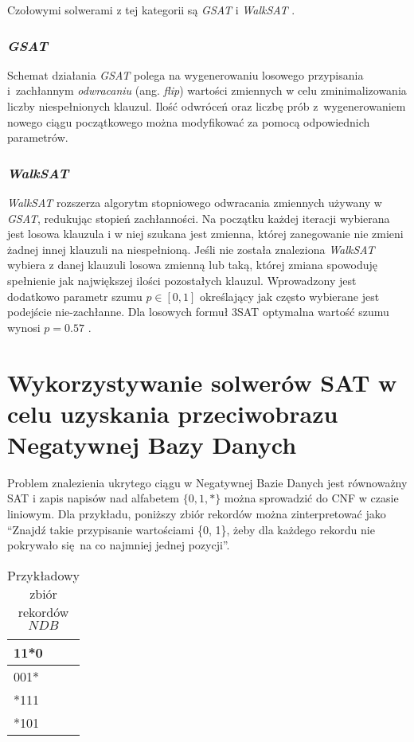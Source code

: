 Czołowymi solwerami z tej kategorii są \textit{GSAT} i \textit{WalkSAT} \cite{handbook-satifiability-incomplete}.


\subsubsection{\textit{GSAT}}
Schemat działania \textit{GSAT} polega na wygenerowaniu losowego przypisania i~zachłannym \textit{odwracaniu} (ang. \textit{flip})
wartości zmiennych w celu zminimalizowania liczby niespełnionych klauzul. Ilość odwróceń oraz liczbę prób
z~wygenerowaniem nowego ciągu początkowego można modyfikować za pomocą odpowiednich parametrów.

\subsubsection{\textit{WalkSAT}}
\textit{WalkSAT} rozszerza algorytm stopniowego odwracania zmiennych używany w \textit{GSAT}, redukując stopień zachłanności.
Na początku każdej iteracji wybierana jest losowa klauzula i w niej szukana jest zmienna, której zanegowanie nie zmieni żadnej
innej klauzuli na niespełnioną. Jeśli nie została znaleziona \textit{WalkSAT} wybiera z danej klauzuli losowa zmienną lub taką, której
zmiana spowoduję spełnienie jak największej ilości pozostałych klauzul. Wprowadzony jest dodatkowo parametr szumu $p \in [0, 1]$ określający
jak często wybierane jest podejście nie-zachłanne. Dla losowych formuł 3SAT optymalna wartość szumu wynosi $p = 0.57$ \cite{handbook-satifiability-incomplete}.



\section{Wykorzystywanie solwerów SAT w celu uzyskania przeciwobrazu Negatywnej Bazy Danych}

Problem znalezienia ukrytego ciągu w Negatywnej Bazie Danych jest równoważny SAT i zapis napisów nad alfabetem 
$\{0, 1, *\}$ można sprowadzić do CNF w czasie liniowym.
 Dla przykładu, poniższy zbiór rekordów można zinterpretować jako 
 \enquote{Znajdź takie przypisanie wartościami \{0, 1\}, żeby dla każdego rekordu nie pokrywało się na co najmniej jednej pozycji}.
 
\begin{table}[h]

    \centering
    \label{Tbl:NDB-sat-example}
    \begin{tabular}{|l|}
    	\hline
    	11*0 \\ \hline
    	001* \\ \hline
    	*111 \\ \hline
    	*101 \\ \hline
    \end{tabular}
    \caption{Przykładowy zbiór rekordów $NDB$}
\end{table}

